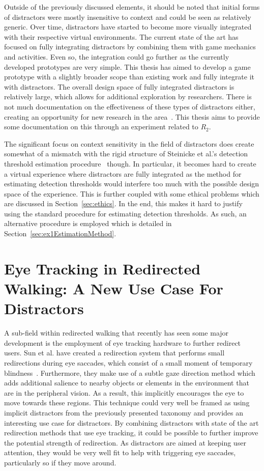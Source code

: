 Outside of the previously discussed elements, it should be noted that initial forms of distractors were mostly insensitive to context and could be seen as relatively generic. Over time, distractors have started to become more visually integrated with their respective virtual environments. The current state of the art has focused on fully integrating distractors by combining them with game mechanics and activities. Even so, the integration could go further as the currently developed prototypes are very simple. This thesis has aimed to develop a game prototype with a slightly broader scope than existing work and fully integrate it with distractors. The overall design space of fully integrated distractors is relatively large, which allows for additional exploration by researchers. There is not much documentation on the effectiveness of these types of distractors either, creating an opportunity for new research in the area~\cite{nilsson201815}. This thesis aims to provide some documentation on this through an experiment related to $R_2$.

The significant focus on context sensitivity in the field of distractors does create somewhat of a mismatch with the rigid structure of Steinicke et al.'s detection threshold estimation procedure~\cite{5072212} though. In particular, it becomes hard to create a virtual experience where distractors are fully integrated as the method for estimating detection thresholds would interfere too much with the possible design space of the experience. This is further coupled with some ethical problems which are discussed in Section~\ref{sec:ethics}. In the end, this makes it hard to justify using the standard procedure for estimating detection thresholds. As such, an alternative procedure is employed which is detailed in Section~\ref{sec:ex1EstimationMethod}. 

\section{Eye Tracking in Redirected Walking: A New Use Case For Distractors}\label{sec:relatedEyeTracking}
A sub-field within redirected walking that recently has seen some major development is the employment of eye tracking hardware to further redirect users. Sun et al. have created a redirection system that performs small redirections during eye saccades, which consist of a small moment of temporary blindness~\cite{sun2018towards}. Furthermore, they make use of a subtle gaze direction method which adds additional salience to nearby objects or elements in the environment that are in the peripheral vision. As a result, this implicitly encourages the eye to move towards these regions. This technique could very well be framed as using implicit distractors from the previously presented taxonomy and provides an interesting use case for distractors. By combining distractors with state of the art redirection methods that use eye tracking, it could be possible to further improve the potential strength of redirection. As distractors are aimed at keeping user attention, they would be very well fit to help with triggering eye saccades, particularly so if they move around. 

